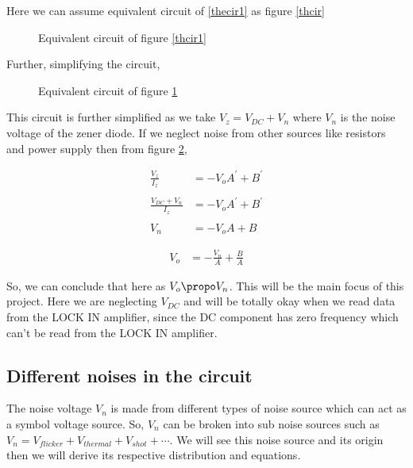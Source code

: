 \documentclass[12pt]{article}
\begin{document}
Here we can assume equivalent circuit of \ref{thecir1} as figure \ref{thcir} 

\begin{figure}[hbt!]
\caption{Equivalent circuit of figure \ref{thcir1} \label{thcir2}}
\end{figure}

Further, simplifying the circuit,

\begin{figure}[hbt!]
\caption{Equivalent circuit of figure \ref{thcir2} \label{thcir3}}
\end{figure}

This circuit is further simplified as we take $V_z = V_{DC} + V_n$ where $V_n$ is the noise voltage of the zener diode.
If we neglect noise from other sources like resistors and power supply then from figure \ref{thcir3},

\begin{align*}
\frac{V_z}{I_z} & = -V_oA^{\prime} +B^{\prime}\\
  \\
\frac{V_{DC}+V_n}{I_z} & =  -V_oA^{\prime} +B^{\prime}\\
\\  
V_n & = -V_oA+B
\end{align*}


\begin{align} \label{vo}
V_o & = -\frac{V_n}{A}+\frac{B}{A}
\end{align}



So, we can conclude that here as $V_o \propo V_n$.  This will be the main focus of this project. Here we are neglecting $V_{DC}$ and will be totally okay when we read data from the LOCK IN amplifier, since the DC component has zero frequency which can’t be read from the LOCK IN amplifier.

\subsection{Different noises in the circuit \label{thno}}

The noise voltage $V_n$ is made from different types of noise source which can act as a symbol voltage source. So, $V_n$ can be broken into sub noise sources such as $V_n = V_{flicker}+V_{thermal} + V_{shot} +\cdots$. We will see this noise source and its origin then we will derive its respective distribution and equations.
\end{document}
